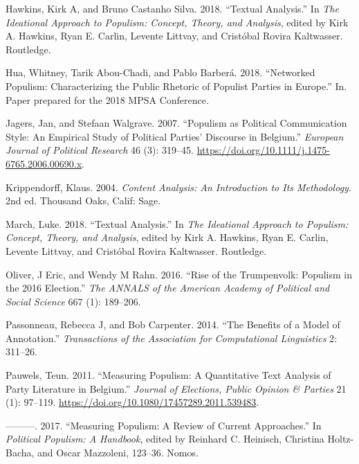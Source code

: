 \documentclass[]{article}
\begin{document}
\leavevmode\hypertarget{ref-hawkins_textual_2018}{}%
Hawkins, Kirk A, and Bruno Castanho Silva. 2018. ``Textual Analysis.''
In \emph{The Ideational Approach to Populism: Concept, Theory, and
Analysis}, edited by Kirk A. Hawkins, Ryan E. Carlin, Levente Littvay,
and Cristóbal Rovira Kaltwasser. Routledge.

\leavevmode\hypertarget{ref-hua_networked_2018}{}%
Hua, Whitney, Tarik Abou-Chadi, and Pablo Barberá. 2018. ``Networked
Populism: Characterizing the Public Rhetoric of Populist Parties in
Europe.'' In. Paper prepared for the 2018 MPSA Conference.

\leavevmode\hypertarget{ref-jagers_populism_2007}{}%
Jagers, Jan, and Stefaan Walgrave. 2007. ``Populism as Political
Communication Style: An Empirical Study of Political Parties' Discourse
in Belgium.'' \emph{European Journal of Political Research} 46 (3):
319--45. \url{https://doi.org/10.1111/j.1475-6765.2006.00690.x}.

\leavevmode\hypertarget{ref-krippendorff_content_2004}{}%
Krippendorff, Klaus. 2004. \emph{Content Analysis: An Introduction to
Its Methodology}. 2nd ed. Thousand Oaks, Calif: Sage.

\leavevmode\hypertarget{ref-march_textual_2018}{}%
March, Luke. 2018. ``Textual Analysis.'' In \emph{The Ideational
Approach to Populism: Concept, Theory, and Analysis}, edited by Kirk A.
Hawkins, Ryan E. Carlin, Levente Littvay, and Cristóbal Rovira
Kaltwasser. Routledge.

\leavevmode\hypertarget{ref-oliver_rise_2016}{}%
Oliver, J Eric, and Wendy M Rahn. 2016. ``Rise of the Trumpenvolk:
Populism in the 2016 Election.'' \emph{The ANNALS of the American
Academy of Political and Social Science} 667 (1): 189--206.

\leavevmode\hypertarget{ref-passonneau_benefits_2014}{}%
Passonneau, Rebecca J, and Bob Carpenter. 2014. ``The Benefits of a
Model of Annotation.'' \emph{Transactions of the Association for
Computational Linguistics} 2: 311--26.

\leavevmode\hypertarget{ref-pauwels_measuring_2011-1}{}%
Pauwels, Teun. 2011. ``Measuring Populism: A Quantitative Text Analysis
of Party Literature in Belgium.'' \emph{Journal of Elections, Public
Opinion \& Parties} 21 (1): 97--119.
\url{https://doi.org/10.1080/17457289.2011.539483}.

\leavevmode\hypertarget{ref-pauwels_measuring_2017}{}%
---------. 2017. ``Measuring Populism: A Review of Current Approaches.''
In \emph{Political Populism: A Handbook}, edited by Reinhard C.
Heinisch, Christina Holtz-Bacha, and Oscar Mazzoleni, 123--36. Nomos.
\end{document}
